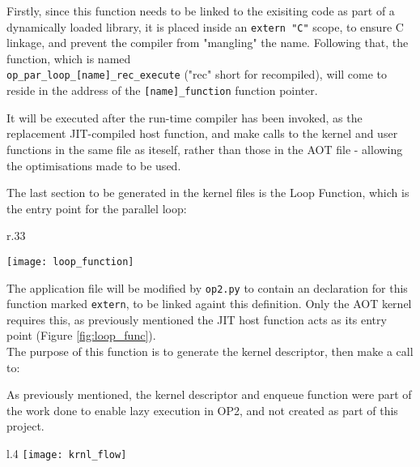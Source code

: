 Firstly, since this function needs to be linked to the exisiting code as part of a dynamically loaded library, it is placed inside an \verb|extern "C"| scope, to ensure C linkage, and prevent the compiler from "mangling" the name. Following that, the function, which is named\\
\verb|op_par_loop_[name]_rec_execute| ("rec" short for recompiled), will come to reside in the address of the \verb|[name]_function| function pointer.
\par
It will be executed after the run-time compiler has been invoked, as the replacement JIT-compiled host function, and make calls to the kernel and user functions in the same file as iteself, rather than those in the AOT file - allowing the optimisations made to be used.

The last section to be generated in the kernel files is the Loop Function, which is the entry point for the parallel loop:

\begin{wrapfigure}[12]{r}{.33\textwidth}
  \vspace{-3em}
  \centering
  \caption{Loop Function}
  \label{fig:loop_func}
  \texttt{[image: loop\_function]}
\end{wrapfigure}
The application file will be modified by \verb|op2.py| to contain an declaration for this function marked \verb|extern|, to be linked againt this definition. Only the AOT kernel requires this, as previously mentioned the JIT host function acts as its entry point (Figure \ref{fig:loop_func}).
\\
The purpose of this function is to generate the kernel descriptor, then make a call to:

\noindent As previously mentioned, the kernel descriptor and enqueue function were part of the work done to enable lazy execution in OP2, and not created as part of this project.

\vspace{2em}

\begin{wrapfigure}[13]{l}{.4\textwidth}
  \vspace{-2em}
  \centering
  \texttt{[image: krnl\_flow]}
  \caption{Kernel Flow}
  \label{fig:krnl_flow}
\end{wrapfigure}

